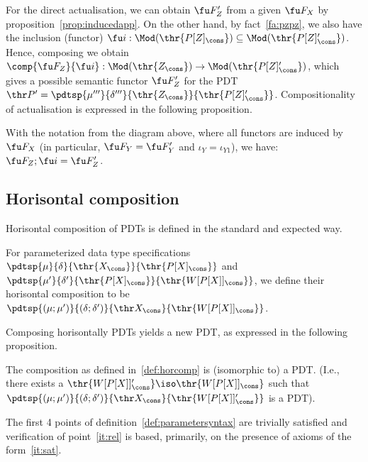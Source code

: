 For the direct actualisation, we can obtain $\fu F'_Z$ from a given $\fu
F_X$ by proposition~\ref{prop:inducedapp}. On the other hand,
by fact~\ref{fa:pzpz}, we also have the inclusion (functor) 
$\fu i:\Mod(\thr{P[Z]_\cons})\subseteq\Mod(\thr{P[Z]'_\cons})$.  
Hence, composing we obtain $\comp{\fu
F_Z}{\fu i}:\Mod(\thr{Z_\cons})\to\Mod(\thr{P[Z]'_\cons})$, which gives a
possible semantic functor $\fu F'_Z$ for the PDT
$\thr P'=\pdtsp{\mu'''}{\delta'''}{\thr{Z_\cons}}{\thr{P[Z]'_\cons}}$. 
Compositionality of actualisation is expressed in the following proposition.
%
\begin{proposition}
With the notation from the diagram above, where all functors are induced by
$\fu F_X$ (in particular, $\fu F_Y=\fu F'_Y$ and $\iota_Y=\iota_{Y1}$), we have:
$\fu F_Z;\fu i = \fu F'_Z$.
\end{proposition}
%
\subsection{Horisontal composition}\label{sec:semfunccomp}\label{sub:hcsyn}
Horisontal composition of PDTs is defined in the standard and expected way.
\begin{definition}\label{def:horcomp}
For parameterized data type specifications
$\pdtsp{\mu}{\delta}{\thr{X_\cons}}{\thr{P[X]_\cons}}$ and
$\pdtsp{\mu'}{\delta'}{\thr{P[X]_\cons}}{\thr{W[P[X]]_\cons}}$,
we define their horisontal composition to be $\pdtsp{(\mu;\mu')}{(\delta;\delta')}{\thr
X_\cons}{\thr{W[P[X]]_\cons}}$. 
\end{definition}
%
Composing horisontally PDTs yields a new PDT, as expressed in the following proposition.
\begin{proposition}\label{prop:horcomp}
The composition as defined in~\ref{def:horcomp} is (isomorphic to) a
PDT. (I.e., there exists a $\thr{W[P[X]]'_\cons}\iso\thr{W[P[X]]_\cons}$
such that $\pdtsp{(\mu;\mu')}{(\delta;\delta')}{\thr
X_\cons}{\thr{W[P[X]]'_\cons}}$ is a PDT).
\end{proposition}
The first 4 points of definition~\ref{def:parametersyntax} are trivially
satisfied and verification of point~\ref{it:rel} is based, primarily, on the 
presence of axioms of the form~\ref{it:sat}.

